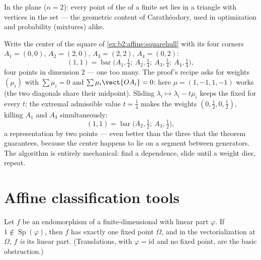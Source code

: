 \begin{example}
In the plane ($n = 2$): every point of the  of a finite
set lies in a triangle with vertices in the set --- the geometric
content of Carathéodory, used in optimization and probability
(mixtures) alike.
\end{example}

\begin{example}\label{ex:b2:affine:caratheodoryrun}
Write the center of the square of
\cref{ex:b2:affine:squarehull} with its four corners $A_1 =
(0,0)$, $A_2 = (2,0)$, $A_3 = (2,2)$, $A_4 = (0,2)$:
\[
(1,1) = \operatorname{bar}\bigl(A_1, \tfrac14;\ A_2,
\tfrac14;\ A_3, \tfrac14;\ A_4, \tfrac14\bigr),
\]
four points in dimension $2$ --- one too many. The proof's
recipe asks for weights $(\mu_i)$ with $\sum\mu_i = 0$ and
$\sum\mu_i\vect{OA_i} = 0$: here $\mu = (1, -1, 1, -1)$ works
(the two diagonals share their midpoint). Sliding $\lambda_i
\mapsto \lambda_i - t\mu_i$ keeps the  fixed for
every $t$; the extremal admissible value $t = \frac14$ makes
the weights $(0, \tfrac12, 0, \tfrac12)$, killing $A_1$ and
$A_3$ simultaneously:
\[
(1,1) = \operatorname{bar}\bigl(A_2, \tfrac12;\ A_4,
\tfrac12\bigr),
\]
a representation by two points --- even better than the three
that the theorem guarantees, because the center happens to
lie on a segment between generators. The algorithm is
entirely mechanical: find a dependence, slide until a weight
dies, repeat.
\end{example}

\section{Affine classification tools}

\begin{proposition}\label{prop:b2:affine:fixedpoint}
Let $f$ be an  endomorphism of a finite-dimensional  with linear part $\varphi$. If $1 \notin
\operatorname{Sp}(\varphi)$, then $f$ has exactly one fixed point
$\Omega$, and in the vectorialization at $\Omega$, $f$ \emph{is}
its linear part. (Translations, with $\varphi = \mathrm{id}$ and no
fixed point, are the basic obstruction.)
\end{proposition}

